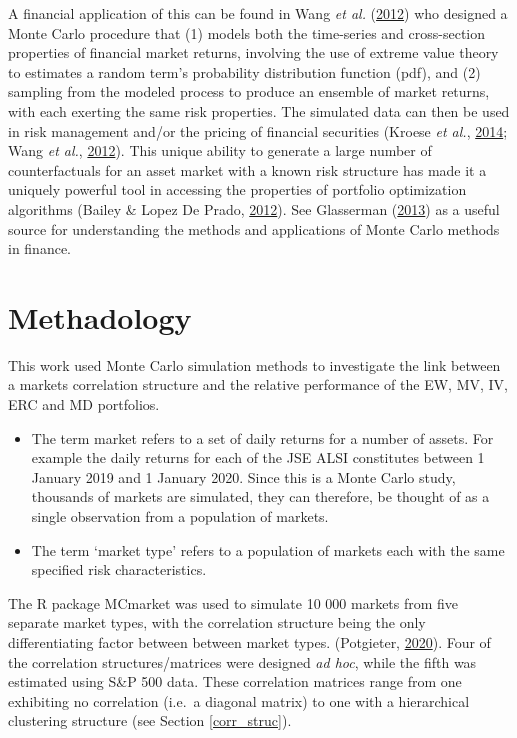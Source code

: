 \documentclass[11pt,preprint, authoryear]{elsarticle}
\numberwithin{equation}{section}
\numberwithin{figure}{section}
\numberwithin{table}{section}
\def\tightlist{} %
\begin{document}
A financial application of this can be found in Wang \emph{et al.}
(\protect\hyperlink{ref-wang2012}{2012}) who designed a Monte Carlo
procedure that (1) models both the time-series and cross-section
properties of financial market returns, involving the use of extreme
value theory to estimates a random term's probability distribution
function (pdf), and (2) sampling from the modeled process to produce an
ensemble of market returns, with each exerting the same risk properties.
The simulated data can then be used in risk management and/or the
pricing of financial securities (Kroese \emph{et al.},
\protect\hyperlink{ref-kroese2014}{2014}; Wang \emph{et al.},
\protect\hyperlink{ref-wang2012}{2012}). This unique ability to generate
a large number of counterfactuals for an asset market with a known risk
structure has made it a uniquely powerful tool in accessing the
properties of portfolio optimization algorithms (Bailey \& Lopez De
Prado, \protect\hyperlink{ref-lopez2012}{2012}). See Glasserman
(\protect\hyperlink{ref-glasserman2013}{2013}) as a useful source for
understanding the methods and applications of Monte Carlo methods in
finance.

\hypertarget{methadology}{%
\section{\texorpdfstring{Methadology
\label{methadology}}{Methadology }}\label{methadology}}

This work used Monte Carlo simulation methods to investigate the link
between a markets correlation structure and the relative performance of
the EW, MV, IV, ERC and MD portfolios.

\begin{itemize}
\tightlist
\item
  The term market refers to a set of daily returns for a number of
  assets. For example the daily returns for each of the JSE ALSI
  constitutes between 1 January 2019 and 1 January 2020. Since this is a
  Monte Carlo study, thousands of markets are simulated, they can
  therefore, be thought of as a single observation from a population of
  markets.
\item
  The term `market type' refers to a population of markets each with the
  same specified risk characteristics.
\end{itemize}

The R package MCmarket was used to simulate 10 000 markets from five
separate market types, with the correlation structure being the only
differentiating factor between between market types. (Potgieter,
\protect\hyperlink{ref-MCmarket}{2020}). Four of the correlation
structures/matrices were designed \emph{ad hoc}, while the fifth was
estimated using S\&P 500 data. These correlation matrices range from one
exhibiting no correlation (i.e.~a diagonal matrix) to one with a
hierarchical clustering structure (see Section \ref{corr_struc}).
\end{document}
